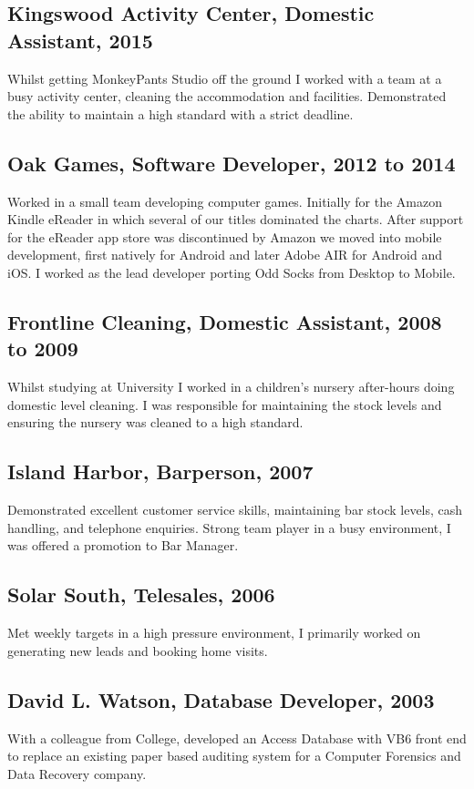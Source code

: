 \documentclass{article}
\begin{document}
\subsection{Kingswood Activity Center, Domestic Assistant, 2015}
Whilst getting MonkeyPants Studio off the ground I worked with a team at a busy activity center, cleaning the accommodation and facilities.  Demonstrated the ability to maintain a high standard with a  strict deadline.
\subsection{Oak Games, Software Developer, 2012 to 2014}
Worked in a small team developing computer games.  Initially for the Amazon Kindle eReader in which several of our titles dominated the charts.  After support for the eReader app store was discontinued by Amazon we moved into mobile development, first natively for Android and later Adobe AIR for Android and iOS.  I worked as the lead developer porting Odd Socks from Desktop to Mobile.
\subsection{Frontline Cleaning, Domestic Assistant, 2008 to 2009}
Whilst studying at University I worked in a children's nursery after-hours doing domestic level cleaning.  I was responsible for maintaining the stock levels and ensuring the nursery was cleaned to a high standard.
\subsection{Island Harbor, Barperson, 2007}
Demonstrated excellent customer service skills, maintaining bar stock levels, cash handling, and telephone enquiries.  Strong team player in a busy environment, I was offered a promotion to Bar Manager.
\subsection{Solar South, Telesales, 2006}
Met weekly targets in a high pressure environment, I primarily worked on generating new leads and booking home visits.
\subsection{David L. Watson, Database Developer, 2003}
With a colleague from College, developed an Access Database with VB6 front end to replace an existing paper based auditing system for a Computer Forensics and Data Recovery company.
\end{document}
